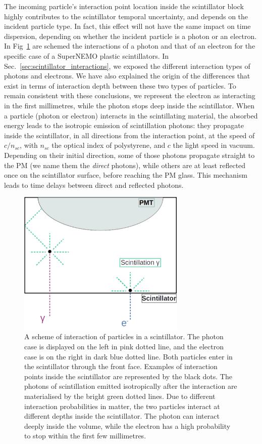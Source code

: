 The incoming particle's interaction point location inside the scintillator block highly contributes to the scintillator temporal uncertainty, and depends on the incident particle type.
In fact, this effect will not have the same impact on time dispersion, depending on whether the incident particle is a photon or an electron.
In Fig~\ref{fig:photon_scintilator} are schemed the interactions of a photon and that of an electron for the specific case of a SuperNEMO plastic scintillators.
In Sec.~\ref{sec:scintillator_interactions}, we exposed the different interaction types of photons and electrons.
We have also explained the origin of the differences that exist in terms of interaction depth between these two types of particles.
To remain consistent with these conclusions, we represent the electron as interacting in the first millimetres, while the photon stops deep inside the scintillator.
When a particle (photon or electron) interacts in the scintillating material, the absorbed energy leads to the isotropic emission of scintillation photons:
they propagate inside the scintillator, in all directions from the interaction point, at the speed of $c/n_{sc}$, with $n_{sc}$ the optical index of polystyrene, and $c$ the light speed in vacuum.
Depending on their initial direction, some of those photons propagate straight to the PM (we name them the \emph{direct} photons), while others are at least reflected once on the scintillator surface, before reaching the PM glass.
This mechanism leads to time delays between direct and reflected photons.
\begin{figure}[h]
  \centering
  \includegraphics[width=8cm]{commissioning/fig_commissioning/Co_multi_reflection.pdf}
  \caption{A scheme of interaction of particles in a scintillator.
    The photon case is displayed on the left in pink dotted line, and the electron case is on the right in dark blue dotted line.
    Both particles enter in the scintillator through the front face.
    Examples of interaction points inside the scintillator are represented by the black dots.
    The photons of scintillation emitted isotropically after the interaction are materialised by the bright green dotted lines.
    Due to different interaction probabilities in matter, the two particles interact at different depths inside the scintillator.
    The photon can interact deeply inside the volume, while the electron has a high probability to stop within the first few millimetres.
    \label{fig:photon_scintilator}}
\end{figure}

